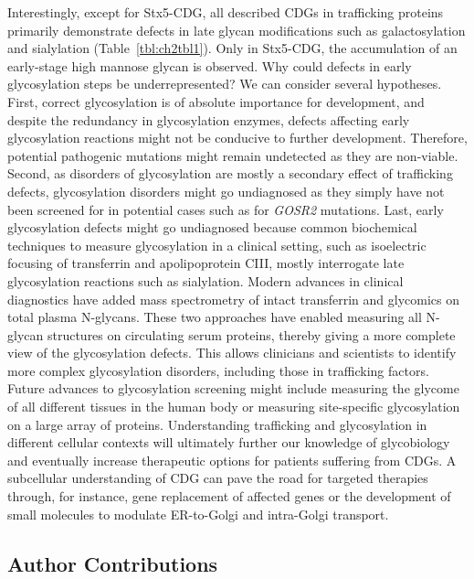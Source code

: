 Interestingly, except for Stx5-CDG, all described CDGs in trafficking proteins primarily demonstrate defects in late glycan modifications such as galactosylation and sialylation (Table~\ref{tbl:ch2tbl1}). Only in Stx5-CDG, the accumulation of an early-stage high mannose glycan is observed. Why could defects in early glycosylation steps be underrepresented? We can consider several hypotheses. First, correct glycosylation is of absolute importance for development\cite{haltiwanger_role_2004,moremen_vertebrate_2012}, and despite the redundancy in glycosylation enzymes, defects affecting early glycosylation reactions might not be conducive to further development. Therefore, potential pathogenic mutations might remain undetected as they are non-viable. Second, as disorders of glycosylation are mostly a secondary effect of trafficking defects, glycosylation disorders might go undiagnosed as they simply have not been screened for in potential cases such as for \emph{GOSR2} mutations\cite{praschberger_expanding_2015,corbett_mutation_2011}. Last, early glycosylation defects might go undiagnosed because common biochemical techniques to measure glycosylation in a clinical setting, such as isoelectric focusing of transferrin and apolipoprotein CIII\cite{marklova_screening_2007}, mostly interrogate late glycosylation reactions such as sialylation. Modern advances in clinical diagnostics have added mass spectrometry of intact transferrin\cite{scherpenzeel_high-resolution_2015} and glycomics on total plasma N-glycans\cite{abu_bakar_clinical_2018}. These two approaches have enabled measuring all N-glycan structures on circulating serum proteins, thereby giving a more complete view of the glycosylation defects. This allows clinicians and scientists to identify more complex glycosylation disorders, including those in trafficking factors. Future advances to glycosylation screening might include measuring the glycome of all different tissues in the human body or measuring site-specific glycosylation on a large array of proteins. Understanding trafficking and glycosylation in different cellular contexts will ultimately further our knowledge of glycobiology and eventually increase therapeutic options for patients suffering from CDGs. A subcellular understanding of CDG can pave the road for targeted therapies through, for instance, gene replacement of affected genes or the development of small molecules to modulate ER-to-Golgi and intra-Golgi transport.

\subsection{Author Contributions}

